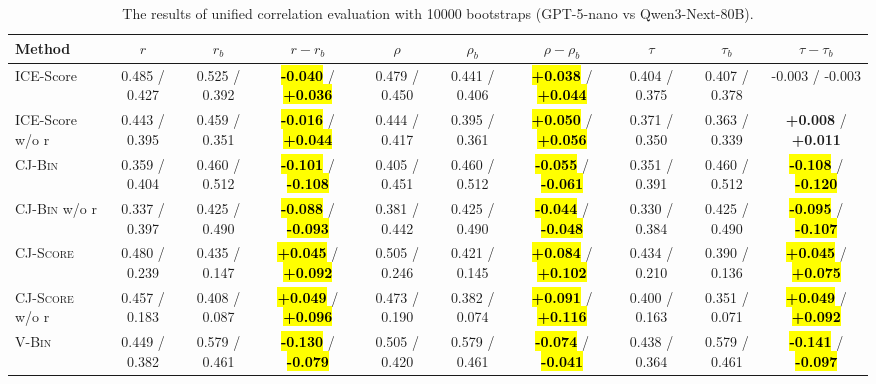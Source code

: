 \begin{table}[t]
    \centering
    \scriptsize
    \setlength{\tabcolsep}{3.5pt}
    \caption{The results of unified correlation evaluation with 10000 bootstraps (GPT-5-nano vs Qwen3-Next-80B).}
    \label{tab:unified-settings-models}
    \begin{tabular}{@{}
        l|ccc|ccc|ccc@{}}
        \toprule
        Method & $r$ & $r_b$ & $r-r_b$ & $\rho$ & $\rho_b$ & $\rho-\rho_b$ & $\tau$ & $\tau_b$ & $\tau-\tau_b$ \\
        \midrule
        \midrule
        ICE-Score               & 0.485 / 0.427   & 0.525 / 0.392   & \hl{\textbf{-0.040}} / \hl{\textbf{+0.036}} & 0.479 / 0.450   & 0.441 / 0.406   & \hl{\textbf{+0.038}} / \hl{\textbf{+0.044}} & 0.404 / 0.375   & 0.407 / 0.378   & -0.003 / -0.003                     \\
        ICE-Score w/o r         & 0.443 / 0.395   & 0.459 / 0.351   & \hl{\textbf{-0.016}} / \hl{\textbf{+0.044}} & 0.444 / 0.417   & 0.395 / 0.361   & \hl{\textbf{+0.050}} / \hl{\textbf{+0.056}} & 0.371 / 0.350   & 0.363 / 0.339   & \textbf{+0.008} / \textbf{+0.011}   \\
        \midrule
        \textsc{CJ-Bin}         & 0.359 / 0.404   & 0.460 / 0.512   & \hl{\textbf{-0.101}} / \hl{\textbf{-0.108}} & 0.405 / 0.451   & 0.460 / 0.512   & \hl{\textbf{-0.055}} / \hl{\textbf{-0.061}} & 0.351 / 0.391   & 0.460 / 0.512   & \hl{\textbf{-0.108}} / \hl{\textbf{-0.120}} \\
        \textsc{CJ-Bin} w/o r   & 0.337 / 0.397   & 0.425 / 0.490   & \hl{\textbf{-0.088}} / \hl{\textbf{-0.093}} & 0.381 / 0.442   & 0.425 / 0.490   & \hl{\textbf{-0.044}} / \hl{\textbf{-0.048}} & 0.330 / 0.384   & 0.425 / 0.490   & \hl{\textbf{-0.095}} / \hl{\textbf{-0.107}} \\
        \textsc{CJ-Score}       & 0.480 / 0.239   & 0.435 / 0.147   & \hl{\textbf{+0.045}} / \hl{\textbf{+0.092}} & 0.505 / 0.246   & 0.421 / 0.145   & \hl{\textbf{+0.084}} / \hl{\textbf{+0.102}} & 0.434 / 0.210   & 0.390 / 0.136   & \hl{\textbf{+0.045}} / \hl{\textbf{+0.075}} \\
        \textsc{CJ-Score} w/o r & 0.457 / 0.183   & 0.408 / 0.087   & \hl{\textbf{+0.049}} / \hl{\textbf{+0.096}} & 0.473 / 0.190   & 0.382 / 0.074   & \hl{\textbf{+0.091}} / \hl{\textbf{+0.116}} & 0.400 / 0.163   & 0.351 / 0.071   & \hl{\textbf{+0.049}} / \hl{\textbf{+0.092}} \\
        \midrule
        \textsc{V-Bin}          & 0.449 / 0.382   & 0.579 / 0.461   & \hl{\textbf{-0.130}} / \hl{\textbf{-0.079}} & 0.505 / 0.420   & 0.579 / 0.461   & \hl{\textbf{-0.074}} / \hl{\textbf{-0.041}} & 0.438 / 0.364   & 0.579 / 0.461   & \hl{\textbf{-0.141}} / \hl{\textbf{-0.097}} \\

\end{tabular}
\end{table}
